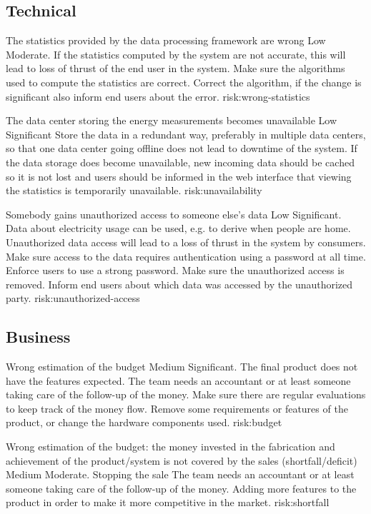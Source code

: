 \subsection{Technical}

{The statistics provided by the data processing framework are wrong}
{Low}
{Moderate. If the statistics computed by the system are not accurate, this will lead to loss of thrust of the end user in the system.}
{Make sure the algorithms used to compute the statistics are correct.}
{Correct the algorithm, if the change is significant also inform end users about the error.}
{risk:wrong-statistics}

{The data center storing the energy measurements becomes unavailable}
{Low}
{Significant}
{Store the data in a redundant way, preferably in multiple data centers, so that one data center going offline does not lead to downtime of the system.}
{If the data storage does become unavailable, new incoming data should be cached so it is not lost and users should be informed in the web interface that viewing the statistics is temporarily unavailable.}
{risk:unavailability}

{Somebody gains unauthorized access to someone else's data}
{Low}
{Significant. Data about electricity usage can be used, e.g. to derive when people are home. Unauthorized data access will lead to a loss of thrust in the system by consumers.}
{Make sure access to the data requires authentication using a password at all time. Enforce users to use a strong password.}
{Make sure the unauthorized access is removed. Inform end users about which data was accessed by the unauthorized party.}
{risk:unauthorized-access}

\subsection{Business}
{Wrong estimation of the budget}
{Medium}
{Significant. The final product does not have the features expected.}
{The team needs an accountant or at least someone taking care of the follow-up of the money. Make sure there are regular evaluations to keep track of the money flow.}
{Remove some requirements or features of the product, or change the hardware components used.}
{risk:budget}

{Wrong estimation of the budget: the money invested in the fabrication and achievement of the product/system is not covered by the sales (shortfall/deficit)}
{Medium}
{Moderate. Stopping the sale}
{The team needs an accountant or at least someone taking care of the follow-up of the money.}
{Adding more features to the product in order to make it more competitive in the market.}
{risk:shortfall}

